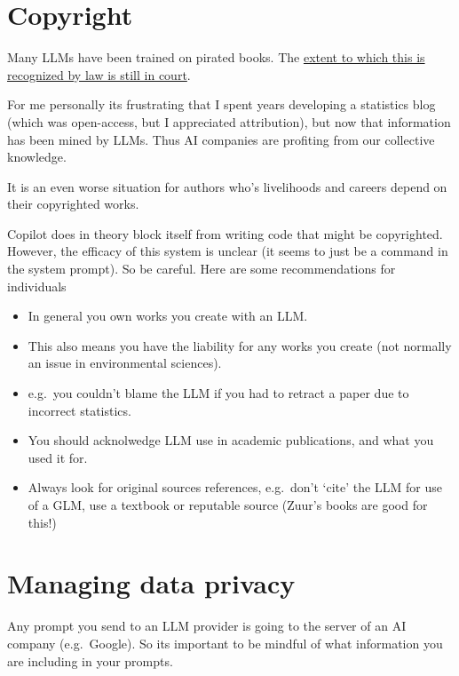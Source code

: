 \documentclass[
  letterpaper,
  DIV=11,
  numbers=noendperiod]{scrreprt}
\providecommand{\tightlist}{%
  \setlength{\itemsep}{0pt}\setlength{\parskip}{0pt}}\usepackage{longtable,booktabs,array}
\begin{document}
\section{Copyright}\label{copyright}

Many LLMs have been trained on pirated books. The
\href{https://www.forbes.com/sites/danpontefract/2025/03/25/authors-challenge-metas-use-of-their-books-for-training-ai/}{extent
to which this is recognized by law is still in court}.

For me personally its frustrating that I spent years developing a
statistics blog (which was open-access, but I appreciated attribution),
but now that information has been mined by LLMs. Thus AI companies are
profiting from our collective knowledge.

It is an even worse situation for authors who's livelihoods and careers
depend on their copyrighted works.

Copilot does in theory block itself from writing code that might be
copyrighted. However, the efficacy of this system is unclear (it seems
to just be a command in the system prompt). So be careful. Here are some
recommendations for individuals

\begin{itemize}
\tightlist
\item
  In general you own works you create with an LLM.
\item
  This also means you have the liability for any works you create (not
  normally an issue in environmental sciences).
\item
  e.g.~you couldn't blame the LLM if you had to retract a paper due to
  incorrect statistics.
\item
  You should acknolwedge LLM use in academic publications, and what you
  used it for.
\item
  Always look for original sources references, e.g.~don't `cite' the LLM
  for use of a GLM, use a textbook or reputable source (Zuur's books are
  good for this!)
\end{itemize}

\section{Managing data privacy}\label{managing-data-privacy}

Any prompt you send to an LLM provider is going to the server of an AI
company (e.g.~Google). So its important to be mindful of what
information you are including in your prompts.
\end{document}
